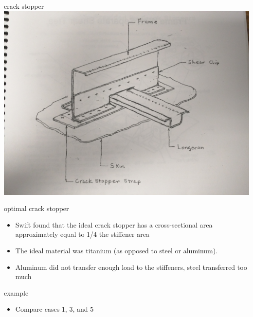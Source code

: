 \documentclass[
  letterpaper,
  ignorenonframetext,
  aspectratio=43,
  handout,
  12pt]{beamer}
\providecommand{\tightlist}{%
  \setlength{\itemsep}{0pt}\setlength{\parskip}{0pt}}
\providecommand{\tightlist}{%
\setlength{\itemsep}{0pt}\setlength{\parskip}{0pt}}
\let\Oldincludegraphics\includegraphics
\renewcommand{\includegraphics}[2][]{\Oldincludegraphics[width=\textwidth,height=0.7\textheight,keepaspectratio]{#2}}
\begin{document}
\begin{frame}{crack stopper}
\protect\hypertarget{crack-stopper}{}
\includegraphics{../images/crack_stoppers.jpg}
\end{frame}

\begin{frame}{optimal crack stopper}
\protect\hypertarget{optimal-crack-stopper}{}
\begin{itemize}
\tightlist
\item
  Swift found that the ideal crack stopper has a cross-sectional area
  approximately equal to 1/4 the stiffener area
\item
  The ideal material was titanium (as opposed to steel or aluminum).
\item
  Aluminum did not transfer enough load to the stiffeners, steel
  transferred too much
\end{itemize}
\end{frame}

\begin{frame}{example}
\protect\hypertarget{example-1}{}
\begin{itemize}
\tightlist
\item
  Compare cases 1, 3, and 5
\end{itemize}
\end{frame}
\end{document}
